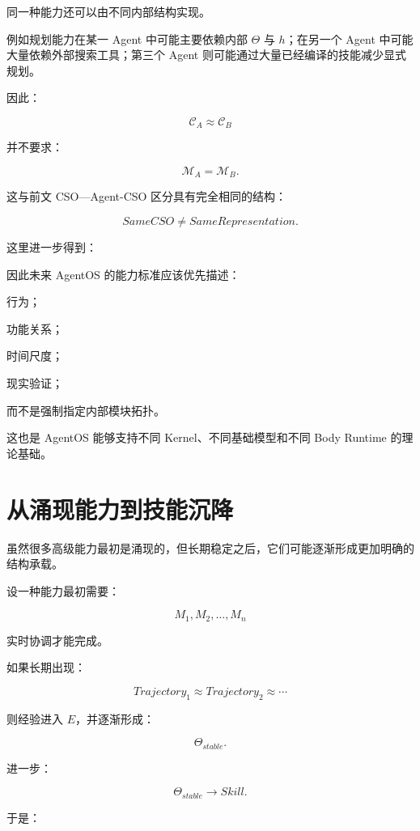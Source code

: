同一种能力还可以由不同内部结构实现。

例如规划能力在某一 Agent 中可能主要依赖内部 $\Theta$ 与 $h$；在另一个 Agent 中可能大量依赖外部搜索工具；第三个 Agent 则可能通过大量已经编译的技能减少显式规划。

因此：

\[
\boxed{
\mathcal C_A
\approx
\mathcal C_B
}
\]

并不要求：

\[
\boxed{
\mathcal M_A
=
\mathcal M_B.
}
\]

这与前文 CSO---Agent-CSO 区分具有完全相同的结构：

\[
SameCSO
\neq
SameRepresentation.
\]

这里进一步得到：

\begin{statementbox}
\centering
{}
\end{statementbox}

因此未来 AgentOS 的能力标准应该优先描述：

行为；

功能关系；

时间尺度；

现实验证；

而不是强制指定内部模块拓扑。

这也是 AgentOS 能够支持不同 Kernel、不同基础模型和不同 Body Runtime 的理论基础。

\section{从涌现能力到技能沉降}

虽然很多高级能力最初是涌现的，但长期稳定之后，它们可能逐渐形成更加明确的结构承载。

设一种能力最初需要：

\[
M_1,M_2,\ldots,M_n
\]

实时协调才能完成。

如果长期出现：

\[
Trajectory_1
\approx
Trajectory_2
\approx
\cdots
\]

则经验进入 $E$，并逐渐形成：

\[
\Theta_{stable}.
\]

进一步：

\[
\Theta_{stable}
\rightarrow
Skill.
\]

于是：

\begin{statementbox}
\centering
{}
\end{statementbox}

